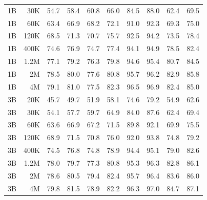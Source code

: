 \begin{table}[h]
\begin{tabulary}{1.0\textwidth}{l r c c c c c c c c}
1B    & 30K   & 54.7 & 58.4 & 60.8 & 66.0 & 84.5 & 88.0 & 62.4 & 69.5 \\
1B    & 60K   & 63.4 & 66.9 & 68.2 & 72.1 & 91.0 & 92.3 & 69.3 & 75.0 \\
1B    & 120K  & 68.5 & 71.3 & 70.7 & 75.7 & 92.5 & 94.2 & 73.5 & 78.4 \\
1B    & 400K  & 74.6 & 76.9 & 74.7 & 77.4 & 94.1 & 94.9 & 78.5 & 82.4 \\
1B    & 1.2M    & 77.1 & 79.2 & 76.3 & 79.8 & 94.6 & 95.4 & 80.7 & 84.5 \\
1B    & 2M    & 78.5 & 80.0 & 77.6 & 80.8 & 95.7 & 96.2 & 82.9 & 85.8 \\
1B    & 4M    & 79.1 & 81.0 & 77.5 & 82.3 & 96.5 & 96.9 & 82.4 & 85.0 \\
\midrule[0.25pt]
3B    & 20K   & 45.7 & 49.7 & 51.9 & 58.1 & 74.6 & 79.2 & 54.9 & 62.6 \\
3B    & 30K   & 54.1 & 57.7 & 59.7 & 64.9 & 84.0 & 87.6 & 62.4 & 69.4 \\
3B    & 60K   & 63.6 & 66.9 & 67.2 & 71.5 & 89.8 & 92.1 & 69.9 & 75.5 \\
3B    & 120K  & 68.9 & 71.5 & 70.8 & 76.0 & 92.0 & 93.8 & 74.8 & 79.2 \\
3B    & 400K  & 74.5 & 76.8 & 74.8 & 78.9 & 94.4 & 95.1 & 79.0 & 82.6 \\
3B    & 1.2M    & 78.0 & 79.7 & 77.3 & 80.8 & 95.3 & 96.3 & 82.8 & 86.1 \\
3B    & 2M    & 78.6 & 80.5 & 79.4 & 82.4 & 95.7 & 96.4 & 83.6 & 86.0 \\
3B    & 4M    & 79.8 & 81.5 & 78.9 & 82.2 & 96.3 & 97.0 & 84.7 & 87.1 \\
    \bottomrule
  \end{tabulary}
\end{table}

